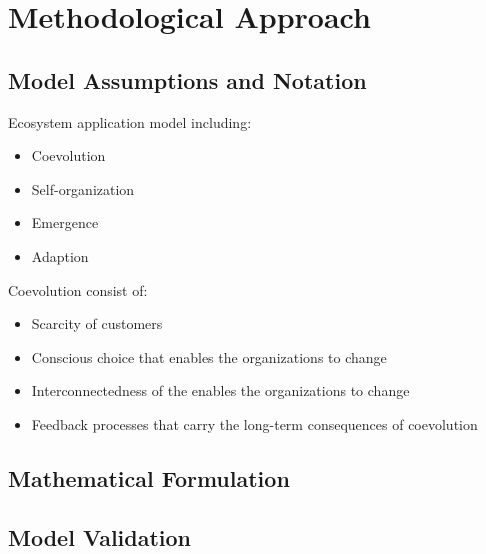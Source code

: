 \section{Methodological Approach} %
\label{sec:methodological_approach}


\subsection{Model Assumptions and Notation} %
\label{sub:model_assumptions}
Ecosystem application model including:

\begin{itemize}
	\item Coevolution
	\item Self-organization
	\item Emergence	
	\item Adaption
\end{itemize}

Coevolution consist of:
\begin{itemize}
	\item Scarcity of customers
	\item Conscious choice that enables the organizations to change
	\item Interconnectedness of the enables the organizations to change
	\item Feedback processes that carry the long-term consequences of coevolution
\end{itemize}

\subsection{Mathematical Formulation} %
\label{sub:mathematical_formulation}


\subsection{Model Validation} %
\label{sub:model_validation}


